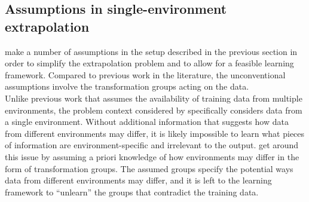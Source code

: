 \subsection{Assumptions in single-environment extrapolation}

\textcite{Mouli:2021} make a number of assumptions in the setup described in the previous section in order to simplify the extrapolation problem and to allow for a feasible learning framework. Compared to previous work in the literature, the unconventional assumptions involve the transformation groups acting on the data.
\\

Unlike previous work that assumes the availability of training data from multiple environments, the problem context considered by \citeauthor{Mouli:2021} specifically considers data from a single environment. Without additional information that suggests how data from different environments may differ, it is likely impossible to learn what pieces of information are environment-specific and irrelevant to the output. \citeauthor{Mouli:2021} get around this issue by assuming a priori knowledge of how environments may differ in the form of transformation groups. The assumed groups specify the potential ways data from different environments may differ, and it is left to the learning framework to ``unlearn'' the groups that contradict the training data.
\\

